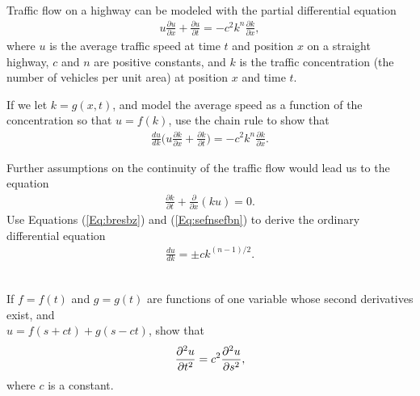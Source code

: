 \item  {}\\ 
Traffic flow on a highway can be modeled with the partial differential equation
\begin{align}\label{Eq:bresbz}
  u\frac{\partial u}{\partial x}+\frac{\partial u}{\partial t}=-c^2k^n\frac{\partial k}{\partial x},
\end{align}
where $u$ is the average traffic speed at time $t$ and position $x$ on a straight highway,  $c$ and $n$ are positive constants, and $k$ is the traffic concentration (the number of vehicles per unit area) at position $x$ and time $t$. 
\BEN
\item If we  let $k=g(x,t)$, and model the average speed as a function of the concentration so that $u=f(k)$, use the chain rule to show that
\begin{align}\label{xcvbxcvbxcvb}
  \frac{du}{dk} \Bigg(u\frac{\partial k}{\partial x}+\frac{\partial k}{\partial t}\Bigg)=-c^2k^n\frac{\partial k}{\partial x}.
\end{align}
\item Further assumptions on the continuity of the traffic flow would lead us to the equation
\begin{align}\label{Eq:sefnsefbn}
  \frac{\partial k}{\partial t}+\frac{\partial}{\partial x}(ku)=0.
\end{align}
Use Equations (\ref{Eq:bresbz}) and (\ref{Eq:sefnsefbn}) to derive the ordinary differential equation
\begin{align}\label{myrtntebrebrebrez}
  \frac{du}{dk}= \pm ck^{(n-1)/2}.
\end{align}
\EEN
\item %
\\ 

If $f=f(t)$ and $g=g(t)$ are functions of one variable whose second derivatives exist, and \\ $u=f(s+ct)+g(s-ct)$, show that 
\begin{align*}
  \frac{\partial^2u}{\partial t^2}=c^2\frac{\partial^2 u}{\partial s^2},
\end{align*}
where $c$ is a constant. 

\EEN
